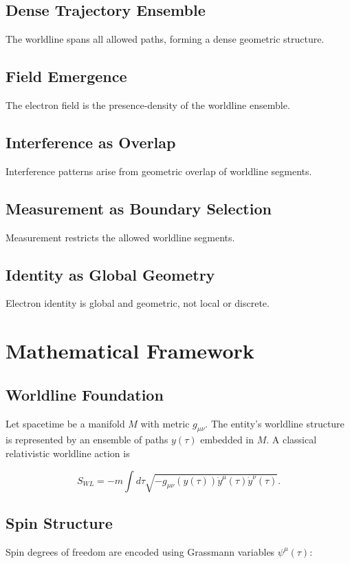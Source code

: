 \documentclass[12pt]{article}
\begin{document}
\subsection{Dense Trajectory Ensemble}
The worldline spans all allowed paths, forming a dense geometric structure.

\subsection{Field Emergence}
The electron field is the presence-density of the worldline ensemble.

\subsection{Interference as Overlap}
Interference patterns arise from geometric overlap of worldline segments.

\subsection{Measurement as Boundary Selection}
Measurement restricts the allowed worldline segments.

\subsection{Identity as Global Geometry}
Electron identity is global and geometric, not local or discrete.

\section{Mathematical Framework}

\subsection{Worldline Foundation}
Let spacetime be a manifold $M$ with metric $g_{\mu\nu}$. The entity’s worldline structure is represented by an ensemble
of paths $y(\tau)$ embedded in $M$. A classical relativistic worldline action is


\[
S_{WL} = -m \int d\tau \sqrt{-g_{\mu\nu}(y(\tau)) \dot{y}^\mu(\tau) \dot{y}^\nu(\tau)}.
\]



\subsection{Spin Structure}
Spin degrees of freedom are encoded using Grassmann variables $\psi^\mu(\tau)$:
\end{document}
